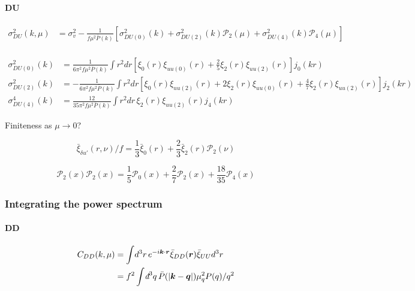 \documentclass[a4paper,11pt, fleqn]{article}
\newcommand{\dbar}{\textit{\dj}}
\begin{document}
%
%
\paragraph{DU}
%
\begin{align}
  \sigma^2_{DU}(k, \mu) &= \sigma_v^2 - \frac{1}{f\mu^2 \bar{P}(k)}
  \left[
    \sigma^2_{DU(0)}(k) + \sigma^2_{DU(2)}(k) \mathcal{P}_2(\mu)
    + \sigma^2_{DU(4)}(k) \mathcal{P}_4(\mu)
    \right]\\
\end{align}


\begin{align}
  \sigma^2_{DU(0)}(k) &= \frac{1}{6\pi^2 f\mu^2\bar{P}(k)} \int\! r^2 dr \left[
    \xi_0(r) \xi_{uu(0)}(r) + \frac{2}{5} \xi_2(r) \xi_{uu(2)}(r)
    \right] j_0(kr)\\
  \sigma^2_{DU(2)}(k) &= -\frac{1}{6\pi^2 f\mu^2 \bar{P}(k)} \int\! r^2 dr \left[
    \xi_0(r) \xi_{uu(2)}(r) + 2 \xi_2(r) \xi_{uu(0)}(r) + \frac{4}{7} \xi_2(r) \xi_{uu(2)}(r)
    \right] j_2(kr)\\
  \sigma^4_{DU(4)}(k) &= \frac{12}{35\pi^2 f\mu^2 \bar{P}(k)} \int\! r^2 dr \,
  \xi_2(r) \xi_{uu(2)}(r) j_4(kr)    
\end{align}

Finiteness as $\mu \rightarrow 0$?

\begin{equation}
  \bar{\xi}_{\delta u'}(r, \nu)/f
  = \frac{1}{3} \bar{\xi}_0(r) + \frac{2}{3} \bar{\xi}_2(r) \mathcal{P}_2(\nu)
\end{equation}

\begin{equation}
  \mathcal{P}_2(x) \mathcal{P}_2(x)
  = \frac{1}{5} \mathcal{P}_0(x) + \frac{2}{7} \mathcal{P}_2(x)
    + \frac{18}{35} \mathcal{P}_4(x)
\end{equation}

\clearpage

%
%
\clearpage
\subsubsection{Integrating the power spectrum}

\paragraph{DD}

\begin{align}
  C_{DD}(k, \mu) &=
    \int\! d^3 r \, e^{-i\bm{k}\cdot\bm{r}}
    \bar{\xi}_{DD}(\bm{r}) \bar{\xi}_{UU}d^3 r\\
  &= f^2 \int \! \dbar^3 q \, \bar{P}(|\bm{k} - \bm{q}|) \mu_q^2 P(q)/q^2
\end{align}
\end{document}
